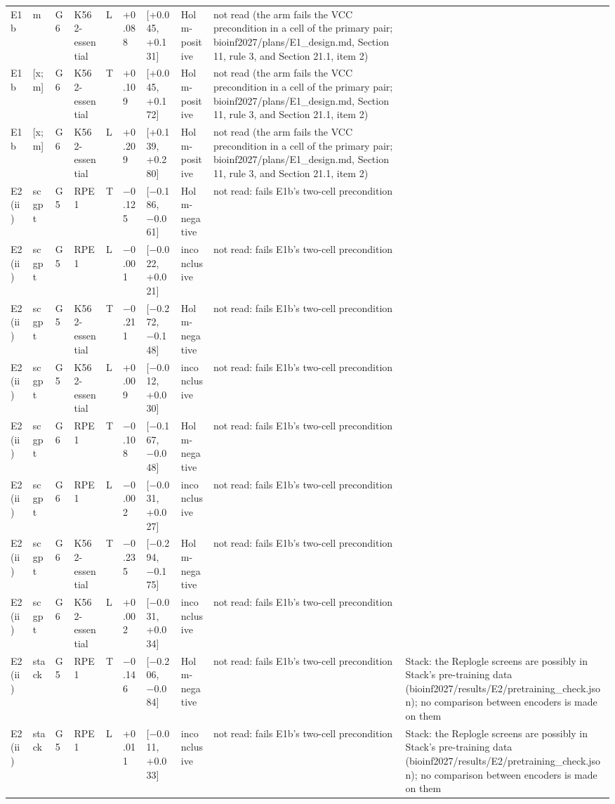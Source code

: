 \begin{tabular}{llllllllll}
E1b & m & G6 & K562-essential & L & +0.088 & [+0.045, +0.131] & Holm-positive & not read (the arm fails the VCC precondition in a cell of the primary pair; bioinf2027/plans/E1\_design.md, Section 11, rule 3, and Section 21.1, item 2) &  \\
E1b & [x; m] & G6 & K562-essential & T & +0.109 & [+0.045, +0.172] & Holm-positive & not read (the arm fails the VCC precondition in a cell of the primary pair; bioinf2027/plans/E1\_design.md, Section 11, rule 3, and Section 21.1, item 2) &  \\
E1b & [x; m] & G6 & K562-essential & L & +0.209 & [+0.139, +0.280] & Holm-positive & not read (the arm fails the VCC precondition in a cell of the primary pair; bioinf2027/plans/E1\_design.md, Section 11, rule 3, and Section 21.1, item 2) &  \\
E2 (ii) & scgpt & G5 & RPE1 & T & −0.125 & [−0.186, −0.061] & Holm-negative & not read: fails E1b's two-cell precondition &  \\
E2 (ii) & scgpt & G5 & RPE1 & L & −0.001 & [−0.022, +0.021] & inconclusive & not read: fails E1b's two-cell precondition &  \\
E2 (ii) & scgpt & G5 & K562-essential & T & −0.211 & [−0.272, −0.148] & Holm-negative & not read: fails E1b's two-cell precondition &  \\
E2 (ii) & scgpt & G5 & K562-essential & L & +0.009 & [−0.012, +0.030] & inconclusive & not read: fails E1b's two-cell precondition &  \\
E2 (ii) & scgpt & G6 & RPE1 & T & −0.108 & [−0.167, −0.048] & Holm-negative & not read: fails E1b's two-cell precondition &  \\
E2 (ii) & scgpt & G6 & RPE1 & L & −0.002 & [−0.031, +0.027] & inconclusive & not read: fails E1b's two-cell precondition &  \\
E2 (ii) & scgpt & G6 & K562-essential & T & −0.235 & [−0.294, −0.175] & Holm-negative & not read: fails E1b's two-cell precondition &  \\
E2 (ii) & scgpt & G6 & K562-essential & L & +0.002 & [−0.031, +0.034] & inconclusive & not read: fails E1b's two-cell precondition &  \\
E2 (ii) & stack & G5 & RPE1 & T & −0.146 & [−0.206, −0.084] & Holm-negative & not read: fails E1b's two-cell precondition & Stack: the Replogle screens are possibly in Stack's pre-training data (bioinf2027/results/E2/pretraining\_check.json); no comparison between encoders is made on them \\
E2 (ii) & stack & G5 & RPE1 & L & +0.011 & [−0.011, +0.033] & inconclusive & not read: fails E1b's two-cell precondition & Stack: the Replogle screens are possibly in Stack's pre-training data (bioinf2027/results/E2/pretraining\_check.json); no comparison between encoders is made on them \\

\end{tabular}
